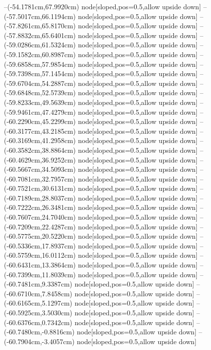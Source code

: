 --(-54.1781cm,67.9920cm) node[sloped,pos=0.5,allow upside down]{\ArrowIn}
--(-57.5017cm,66.1194cm) node[sloped,pos=0.5,allow upside down]{\ArrowIn}
--(-57.8261cm,65.8170cm) node[sloped,pos=0.5,allow upside down]{\arrowIn}
--(-57.8832cm,65.6401cm) node[sloped,pos=0.5,allow upside down]{\arrowIn}
--(-59.0286cm,61.5324cm) node[sloped,pos=0.5,allow upside down]{\ArrowIn}
--(-59.1582cm,60.8987cm) node[sloped,pos=0.5,allow upside down]{\arrowIn}
--(-59.6858cm,57.9854cm) node[sloped,pos=0.5,allow upside down]{\ArrowIn}
--(-59.7398cm,57.1454cm) node[sloped,pos=0.5,allow upside down]{\arrowIn}
--(-59.6704cm,54.2887cm) node[sloped,pos=0.5,allow upside down]{\ArrowIn}
--(-59.6848cm,52.5739cm) node[sloped,pos=0.5,allow upside down]{\ArrowIn}
--(-59.8233cm,49.5639cm) node[sloped,pos=0.5,allow upside down]{\ArrowIn}
--(-59.9461cm,47.4279cm) node[sloped,pos=0.5,allow upside down]{\ArrowIn}
--(-60.2290cm,45.2299cm) node[sloped,pos=0.5,allow upside down]{\ArrowIn}
--(-60.3177cm,43.2185cm) node[sloped,pos=0.5,allow upside down]{\ArrowIn}
--(-60.3169cm,41.2958cm) node[sloped,pos=0.5,allow upside down]{\ArrowIn}
--(-60.3582cm,38.8864cm) node[sloped,pos=0.5,allow upside down]{\ArrowIn}
--(-60.4629cm,36.9252cm) node[sloped,pos=0.5,allow upside down]{\ArrowIn}
--(-60.5667cm,34.5093cm) node[sloped,pos=0.5,allow upside down]{\ArrowIn}
--(-60.7081cm,32.7957cm) node[sloped,pos=0.5,allow upside down]{\ArrowIn}
--(-60.7521cm,30.6131cm) node[sloped,pos=0.5,allow upside down]{\ArrowIn}
--(-60.7189cm,28.8037cm) node[sloped,pos=0.5,allow upside down]{\ArrowIn}
--(-60.7222cm,26.3481cm) node[sloped,pos=0.5,allow upside down]{\ArrowIn}
--(-60.7607cm,24.7040cm) node[sloped,pos=0.5,allow upside down]{\ArrowIn}
--(-60.7209cm,22.4287cm) node[sloped,pos=0.5,allow upside down]{\ArrowIn}
--(-60.5775cm,20.5220cm) node[sloped,pos=0.5,allow upside down]{\ArrowIn}
--(-60.5336cm,17.8937cm) node[sloped,pos=0.5,allow upside down]{\ArrowIn}
--(-60.5759cm,16.0112cm) node[sloped,pos=0.5,allow upside down]{\ArrowIn}
--(-60.6431cm,13.3864cm) node[sloped,pos=0.5,allow upside down]{\ArrowIn}
--(-60.7399cm,11.8039cm) node[sloped,pos=0.5,allow upside down]{\ArrowIn}
--(-60.7481cm,9.3387cm) node[sloped,pos=0.5,allow upside down]{\ArrowIn}
--(-60.6710cm,7.8458cm) node[sloped,pos=0.5,allow upside down]{\ArrowIn}
--(-60.6165cm,5.1297cm) node[sloped,pos=0.5,allow upside down]{\ArrowIn}
--(-60.5925cm,3.5030cm) node[sloped,pos=0.5,allow upside down]{\ArrowIn}
--(-60.6376cm,0.7342cm) node[sloped,pos=0.5,allow upside down]{\ArrowIn}
--(-60.7480cm,-0.8816cm) node[sloped,pos=0.5,allow upside down]{\ArrowIn}
--(-60.7904cm,-3.4057cm) node[sloped,pos=0.5,allow upside down]{\ArrowIn}
